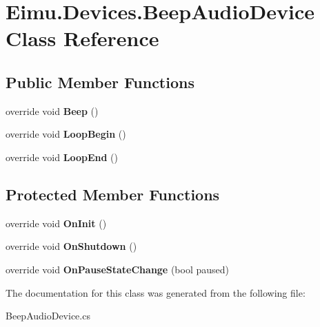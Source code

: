 \hypertarget{class_eimu_1_1_devices_1_1_beep_audio_device}{
\section{Eimu.Devices.BeepAudioDevice Class Reference}
\label{class_eimu_1_1_devices_1_1_beep_audio_device}
}
\subsection*{Public Member Functions}
\begin{DoxyCompactItemize}
\item 
\hypertarget{class_eimu_1_1_devices_1_1_beep_audio_device_afb2cf6656e3eb15df8edfb318e2fa12f}{
override void {\bfseries Beep} ()}
\label{class_eimu_1_1_devices_1_1_beep_audio_device_afb2cf6656e3eb15df8edfb318e2fa12f}

\item 
\hypertarget{class_eimu_1_1_devices_1_1_beep_audio_device_a47493b7b22c27a83932ade394bc232c3}{
override void {\bfseries LoopBegin} ()}
\label{class_eimu_1_1_devices_1_1_beep_audio_device_a47493b7b22c27a83932ade394bc232c3}

\item 
\hypertarget{class_eimu_1_1_devices_1_1_beep_audio_device_a7037f32c2038873209f8d96f34d8d0f6}{
override void {\bfseries LoopEnd} ()}
\label{class_eimu_1_1_devices_1_1_beep_audio_device_a7037f32c2038873209f8d96f34d8d0f6}

\end{DoxyCompactItemize}
\subsection*{Protected Member Functions}
\begin{DoxyCompactItemize}
\item 
\hypertarget{class_eimu_1_1_devices_1_1_beep_audio_device_a60e559298d343a450672747359e0ce8d}{
override void {\bfseries OnInit} ()}
\label{class_eimu_1_1_devices_1_1_beep_audio_device_a60e559298d343a450672747359e0ce8d}

\item 
\hypertarget{class_eimu_1_1_devices_1_1_beep_audio_device_a55e066cdab9250f3d72616c7c05aeda1}{
override void {\bfseries OnShutdown} ()}
\label{class_eimu_1_1_devices_1_1_beep_audio_device_a55e066cdab9250f3d72616c7c05aeda1}

\item 
\hypertarget{class_eimu_1_1_devices_1_1_beep_audio_device_a3c70327346ebab1dc9d992c685623a90}{
override void {\bfseries OnPauseStateChange} (bool paused)}
\label{class_eimu_1_1_devices_1_1_beep_audio_device_a3c70327346ebab1dc9d992c685623a90}

\end{DoxyCompactItemize}


The documentation for this class was generated from the following file:\begin{DoxyCompactItemize}
\item 
BeepAudioDevice.cs\end{DoxyCompactItemize}
